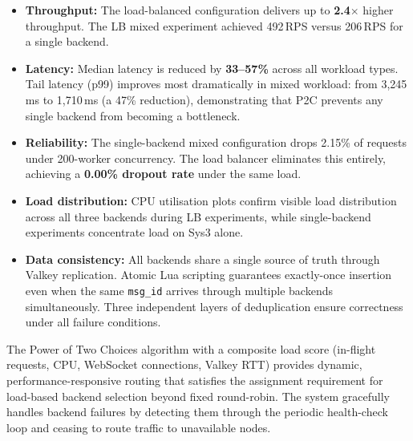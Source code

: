 \documentclass[12pt,a4paper]{article}
\begin{document}
\begin{itemize}
    \item \textbf{Throughput:} The load-balanced configuration delivers up to \textbf{2.4$\times$} higher throughput. The LB mixed experiment achieved 492\,RPS versus 206\,RPS for a single backend.

    \item \textbf{Latency:} Median latency is reduced by \textbf{33--57\%} across all workload types. Tail latency (p99) improves most dramatically in mixed workload: from 3,245\,ms to 1,710\,ms (a 47\% reduction), demonstrating that P2C prevents any single backend from becoming a bottleneck.

    \item \textbf{Reliability:} The single-backend mixed configuration drops 2.15\% of requests under 200-worker concurrency. The load balancer eliminates this entirely, achieving a \textbf{0.00\% dropout rate} under the same load.

    \item \textbf{Load distribution:} CPU utilisation plots confirm visible load distribution across all three backends during LB experiments, while single-backend experiments concentrate load on Sys3 alone.

    \item \textbf{Data consistency:} All backends share a single source of truth through Valkey replication. Atomic Lua scripting guarantees exactly-once insertion even when the same \texttt{msg\_id} arrives through multiple backends simultaneously. Three independent layers of deduplication ensure correctness under all failure conditions.
\end{itemize}

The Power of Two Choices algorithm with a composite load score (in-flight requests, CPU, WebSocket connections, Valkey RTT) provides dynamic, performance-responsive routing that satisfies the assignment requirement for load-based backend selection beyond fixed round-robin. The system gracefully handles backend failures by detecting them through the periodic health-check loop and ceasing to route traffic to unavailable nodes.
\end{document}
